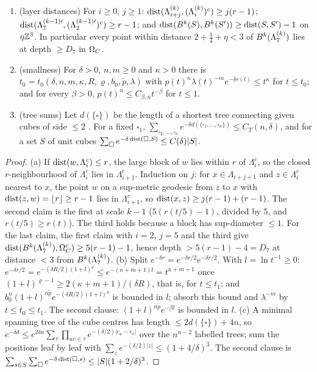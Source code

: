 \begin{lemma}\label{lem:a07:G}
\begin{enumerate}[label=\textup{(\alph*)},nosep,leftmargin=*]
\item \textup{(layer distances)} For $i\ge0$, $j\ge1$: $\operatorname{dist}(\Lambda^{(k)}_{i+j},(\Lambda^{(k)}_i)^c)\ge j(r-1)$; $\operatorname{dist}(\Lambda^{(k-1)\prime}_7,(\Lambda^{(k-1)\prime}_2)^c)\ge r-1$; and $\operatorname{dist}(B^k(S),B^k(S'))\ge\operatorname{dist}(S,S')-1$ on $\eta\mathbb Z^3$. In particular every point within distance $2+\tfrac14+\eta<3$ of $B^k(\Lambda^{(k)}_{7})$ lies at depth $\ge D_7$ in $\Omega_{C}$.

\item \textup{(smallness)} For $\delta>0$, $n,m\ge0$ and $\kappa>0$ there is $t_0=t_0(\delta,n,m,\kappa,R,\varrho,b_0,\tilde p,\lambda)$ with $p(t)^n\lambda(t)^{-m}e^{-\delta r(t)}\le t^\kappa$ for $t\le t_0$; and for every $\beta>0$, $p(t)^n\le C_{\beta,n}t^{-\beta}$ for $t\le1$.
\item \textup{(tree sums)} Let $d(\{\square\})$ be the length of a shortest tree connecting given cubes of side $\le2$ \cite[p.~420]{Ba3}. For a fixed $\square_1$, $\sum_{\square_2,\dots,\square_n}e^{-\delta d(\{\square_1,\dots,\square_n\})}\le C_T(n,\delta)$, and for a set $S$ of unit cubes $\sum_{\square}e^{-\delta\operatorname{dist}(\square,S)}\le C(\delta)|S|$.
\end{enumerate}
\end{lemma}
\begin{proof}
(a) If $\operatorname{dist}(w,\Lambda_i^c)\le r$, the large block of $w$ lies within $r$ of $\Lambda_i^c$, so the closed $r$-neighbourhood of $\Lambda_i^c$ lies in $\Lambda_{i+1}^c$. Induction on $j$: for $x\in\Lambda_{i+j+1}$ and $z\in\Lambda_i^c$ nearest to $x$, the point $w$ on a sup-metric geodesic from $z$ to $x$ with $\operatorname{dist}(z,w)=\lfloor r\rfloor\ge r-1$ lies in $\Lambda_{i+1}^c$, so $\operatorname{dist}(x,z)\ge j(r-1)+(r-1)$. The second claim is the first at scale $k-1$ ($5(r(t/5)-1)$, divided by $5$, and $r(t/5)\ge r(t)$). The third holds because a block has sup-diameter $\le1$. For the last claim, the first claim with $i=2$, $j=5$ and the third give $\operatorname{dist}(B^k(\Lambda^{(k)}_{7}),\Omega_{C}^c)\ge5(r-1)-1$, hence depth $>5(r-1)-4=D_7$ at distance $<3$ from $B^k(\Lambda^{(k)}_{7})$. (b) Split $e^{-\delta r}=e^{-\delta r/2}e^{-\delta r/2}$. With $l=\ln t^{-1}\ge0$: $e^{-\delta r/2}=e^{-(\delta R/2)(1+l)^\varrho}\le e^{-(\kappa+m+1)l}=t^{\kappa+m+1}$ once $(1+l)^{\varrho-1}\ge2(\kappa+m+1)/(\delta R)$, that is, for $t\le t_1$; and $b_0^n(1+l)^{n\tilde p}e^{-(\delta R/2)(1+l)^\varrho}$ is bounded in $l$; absorb this bound and $\lambda^{-m}$ by $t\le t_0\le t_1$. The second clause: $(1+l)^{n\tilde p}e^{-\beta l}$ is bounded in $l$. (c) A minimal spanning tree of the cube centres has length $\le2d(\{\square\})+4n$, so $e^{-\delta d}\le e^{2\delta n}\sum_\tau\prod_{uv\in\tau}e^{-(\delta/2)|c_u-c_v|}$ over the $n^{n-2}$ labelled trees; sum the positions leaf by leaf with $\sum_ze^{-(\delta/2)|z|}\le(1+4/\delta)^3$. The second clause is $\sum_{s\in S}\sum_\square e^{-\delta\operatorname{dist}(\square,s)}\le|S|(1+2/\delta)^3$.
\end{proof}

